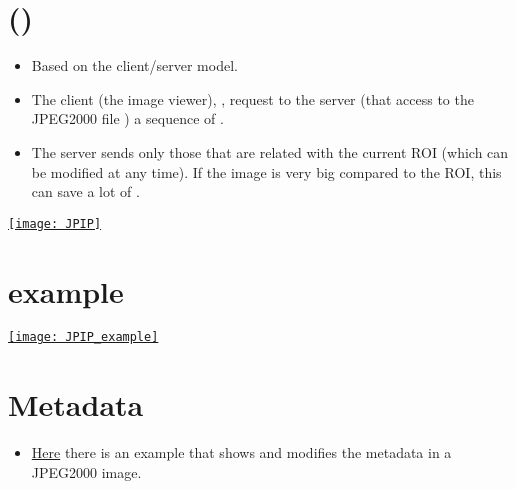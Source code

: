 \section{ ({)}}
\begin{itemize}
\item Based on the client/server model.
\item The client (the image viewer), , request to the server (that access to the
  JPEG2000 file ) a sequence
  of  \cite{ORTIZ04b}.
\item The server sends only those  that are related with the current
  \gls{ROI} (which can be modified at any time). If the image is very
  big compared to the \gls{ROI}, this can save a lot of
  .
\end{itemize}
\begin{center}
  \href{http://www.hpca.ual.es/~vruiz/papers/ORTIZ04c.pdf}{\texttt{[image: JPIP]}}
\end{center}

\section{ example}
\begin{center}
  \href{https://ieeexplore.ieee.org/document/7214293}{\texttt{[image: JPIP\_example]}}
\end{center}

\section{Metadata}
\begin{itemize}
\item
  \href{https://github.com/vicente-gonzalez-ruiz/medical_imaging/blob/main/notebooks/JPEG2000_add_metadata.ipynb}{Here}
  there is an example that shows and modifies the metadata in a JPEG2000
  image.
\end{itemize}
